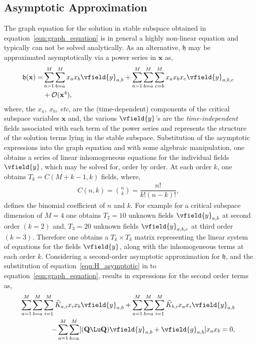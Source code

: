 \subsection{Asymptotic Approximation}
\label{sec:asymptotic_center_manifold}

The graph equation for the solution in stable subspace obtained in equation~\eqref{eqn:graph_equation} is in general a highly non-linear equation and typically can not be solved analytically. As an alternative, $\mathfrak{h}$ may be approximated asymptotically via a power series in $\mathbf{x}$ as, 
\begin{align}
	\label{eqn:H_asymptotic}
	\begin{split}
	\mathfrak{h}(\mathbf{x}) =& \sum_{a=1}^{M}\sum_{b=a}^{M} x_{a}x_{b}\vfield{y}_{a,b} +
	\sum_{a=1}^{M}\sum_{b=a}^{M}\sum_{c=b}^{M} x_{a}x_{b}x_{c}\vfield{y}_{a,b,c} \\
	& + \mathcal{O}(\mathbf{x}^{4}),
\end{split}
\end{align}
where, the $x_{a},\ x_{b}$, \textit{etc}, are the (time-dependent) components of the critical subspace variables $\mathbf{x}$ and, the various $\vfield{y}$'s are the \emph{time-independent} fields associated with each term of the power series and represents the structure of the solution terms lying in the stable subspace. Substitution of the asymptotic expressions into the graph equation and with some algebraic manipulation, one obtains a series of linear inhomogeneous equations for the individual fields $\vfield{y}$, which may be solved for, order by order. At each order $k$, one obtains $T_{k} = C(M+k-1,k)$ fields, where, 
\begin{align}
	\label{eqn:binomial}
	C(n,k) = \binom{n}{k} = \dfrac{n!}{k! (n-k)!},
\end{align}
defines the binomial coefficient of $n$ and $k$. For example for a critical subspace dimension of $M=4$ one obtains $T_{2} = 10$ unknown fields $\vfield{y}_{a,b}$ at second order $(k=2)$ and, $T_{3} = 20$ unknown fields $\vfield{y}_{a,b,c}$ at third order $(k=3)$. Therefore one obtains a $T_{k}\times T_{k}$ matrix representing the linear system of equations for the fields $\vfield{y}$, along with the inhomogeneous terms at each order $k$. Considering a second-order asymptotic approximation for $\mathfrak{h}$, and the substitution of equation~\eqref{eqn:H_asymptotic} in to equation~\eqref{eqn:graph_equation}, results in expressions for the second order terms as,
\begin{align}
	\begin{split}
	\sum_{a=1}^{M}\sum_{b=a}^{M}\sum_{i=1}^{M}\widehat{K}_{a,i}x_{i}x_{b}\vfield{y}_{a,b}  + \sum_{a=1}^{M}\sum_{b=a}^{M}\sum_{i=1}^{M}\widehat{K}_{b,i}x_{a}x_{i}\vfield{y}_{a,b} \\
	- \sum_{a=1}^{M}\sum_{b=a}^{M}[(\mathbf{Q}\Lu\mathbf{Q})\vfield{y}_{a,b} + \vfield{g}_{a,b}]x_{a}x_{b} = 0,
	\end{split}
\end{align}

